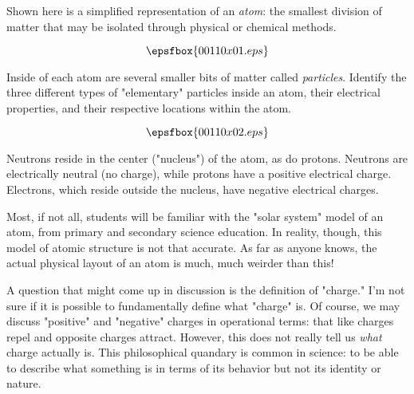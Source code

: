 

Shown here is a simplified representation of an {\it atom}: the smallest division of matter that may be isolated through physical or chemical methods.

$$\epsfbox{00110x01.eps}$$

Inside of each atom are several smaller bits of matter called {\it particles}.  Identify the three different types of "elementary" particles inside an atom, their electrical properties, and their respective locations within the atom.







$$\epsfbox{00110x02.eps}$$

Neutrons reside in the center ("nucleus") of the atom, as do protons.  Neutrons are electrically neutral (no charge), while protons have a positive electrical charge.  Electrons, which reside outside the nucleus, have negative electrical charges.







Most, if not all, students will be familiar with the "solar system" model of an atom, from primary and secondary science education.  In reality, though, this model of atomic structure is not that accurate.  As far as anyone knows, the actual physical layout of an atom is much, much weirder than this!

A question that might come up in discussion is the definition of "charge."  I'm not sure if it is possible to fundamentally define what "charge" is.  Of course, we may discuss "positive" and "negative" charges in operational terms: that like charges repel and opposite charges attract.  However, this does not really tell us {\it what} charge actually is.  This philosophical quandary is common in science: to be able to describe what something is in terms of its behavior but not its identity or nature.





